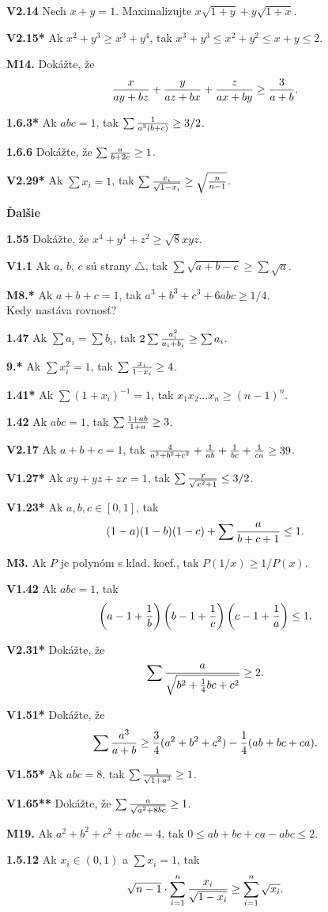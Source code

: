 \documentclass[10pt, twocolumn]{article}
\begin{document}
{\bf V2.14} Nech $x+y=1$. Maximalizujte $x\sqrt{1+y}+y\sqrt{1+x}$.

{\bf V2.15*} Ak $x^2+y^3\ge x^3+y^4$, tak $x^3+y^3\le x^2+y^2\le x+y\le 2$.

{\bf M14.} Dokážte, že $$\displaystyle {x\over ay+bz}+{y\over az+bx}+{z\over ax+by}\ge {3\over a+b}.$$

{\bf 1.6.3*} Ak $abc=1$, tak $\sum {1\over a^3(b+c)}\ge 3/2$.

{\bf 1.6.6} Dokážte, že $\sum {a\over b+2c}\ge 1$.

{\bf V2.29*} Ak $\sum x_i=1$, tak $\sum {x_i\over \sqrt{1-x_i}}\ge \sqrt{n\over n-1}$.

\bigskip
\centerline{\bf Ďalšie}
\medskip

{\bf 1.55} Dokážte, že $x^4+y^4+z^2\ge \sqrt{8} xyz$. 

{\bf V1.1} Ak $a$, $b$, $c$ sú strany $\triangle$, tak
$\sum \sqrt{a+b-c}\ge \sum \sqrt a$.

{\bf M8.*} Ak $a+b+c=1$, tak $a^3+b^3+c^3+6abc\ge 1/4$.\\
Kedy nastáva rovnosť?

{\bf 1.47} Ak $\sum a_i = \sum b_i$, tak $2\sum {a_i^2\over a_i+b_i}\ge \sum a_i$.

{\bf 9.*} Ak $\sum x_i^2 =1$, tak $\sum {x_i\over 1-x_i}\ge 4$.

{\bf 1.41*} Ak $\sum (1+x_i)^{-1}=1$, tak $x_1x_2\dots x_n\ge (n-1)^n$.

{\bf 1.42} Ak $abc=1$, tak $\sum {1+ab\over 1+a}\ge 3$.

{\bf V2.17} Ak $a+b+c=1$, tak ${4\over a^2+b^2+c^2}+{1\over ab}+{1\over bc}+{1\over ca}\ge 39$.

{\bf V1.27*} Ak $xy+yz+zx = 1$, tak $\sum{x\over \sqrt{x^2+1}}\le 3/2$.

{\bf V1.23*} Ak $a,b,c\in [0,1]$, tak
$$
(1-a)(1-b)(1-c)+ \sum{a\over b+c+1}\le 1.
$$

{\bf M3.} Ak $P$ je polynóm s klad. koef., tak  $P(1/x)\ge 1/P(x)$.

{\bf V1.42} Ak $abc=1$, tak
$$
\left(a-1+{1\over b}\right)\left(b-1+{1\over c}\right)\left(c-1+{1\over a}\right)\le 1.
$$

{\bf V2.31*} Dokážte, že
$$
\sum {a\over \sqrt{b^2+{1\over 4}bc+c^2}}\ge 2.
$$

{\bf V1.51*} Dokážte, že
$$
\sum{a^3\over a+b}\ge {3\over 4}(a^2+b^2+c^2)-{1\over 4}(ab+bc+ca).
$$

{\bf V1.55*} Ak $abc=8$, tak $\sum{1\over \sqrt{1+a^3}}\ge 1$.

{\bf V1.65**} Dokážte, že $\sum {a\over \sqrt{a^2+8bc}}\ge 1$.

{\bf M19.} Ak $a^2+b^2+c^2+abc=4$, tak $0\le ab+bc+ca-abc\le 2$.

{\bf 1.5.12} Ak $x_i\in(0,1)$ a $\sum x_i=1$, tak
$$
\sqrt{n-1}\cdot \sum_{i=1}^n {x_i\over \sqrt{1-x_i}}\ge \sum_{i=1}^n \sqrt{x_i}.
$$
\end{document}
